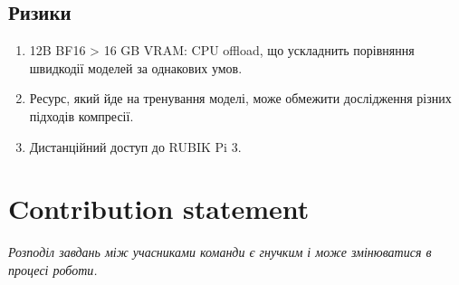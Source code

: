\documentclass[ukrainian]{ucuproposal}
\begin{document}
\subsection{Ризики}
\begin{enumerate}
    \item 12B BF16 > 16 GB VRAM: CPU offload, що ускладнить порівняння швидкодії моделей за однакових умов.
    \item Ресурс, який йде на тренування моделі, може обмежити дослідження різних підходів компресії.
    \item Дистанційний доступ до RUBIK Pi 3.
\end{enumerate}
\section{Contribution statement}
\begin{contributions}

\par\smallskip
{\small\noindent\textit{Розподіл завдань між учасниками команди є гнучким і може змінюватися в процесі роботи.}\par}
\end{contributions}
\ucuprintbibliography
\end{document}
